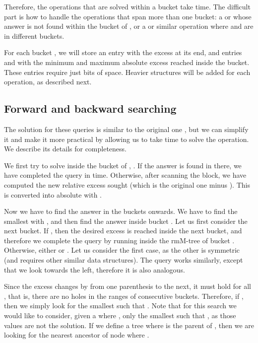 \documentclass[11pt]{article}
\newcommand{\0}{\mathit{0}}
\newcommand{\1}{\mathit{1}}
\begin{document}
Therefore, the operations that are solved within a bucket take 
time.  The difficult part is how to handle the operations that span more than 
one bucket: a  or  whose answer is not found
within the bucket of , or a  or similar operation where 
and  are in different buckets.

For each bucket , we will store an entry  with the
excess at its end, and entries  and  with the minimum and maximum absolute excess reached inside the
bucket. These entries require just  bits of 
space. Heavier structures will be added for each operation, as described next.

\subsection{Forward and backward searching}  \label{sec:fwd-large}

The solution for these queries is similar to the original one \cite{NS14},
but we can simplify it and make it more practical by allowing us to take
 time to solve the operation. 
We describe its details for completeness.

We first try to solve  inside the bucket of , 
. If the answer is found in there, we have completed
the query in  time. Otherwise, after scanning the block, we
have computed the new relative excess sought  (which is the original one
minus ). This is converted into absolute with
. 

Now we have to find the answer in the buckets  onwards. We have to find
the smallest  with , and then find the answer inside
bucket . Let us first consider the next bucket. If 
, then the desired excess is reached inside the 
next bucket, and therefore we complete the query by running 
 inside the rmM-tree of bucket .
Otherwise, either  or . Let us consider the first
case, as the other is symmetric (and requires other similar data structures).
The query  works
similarly, except that we look towards the left, therefore it is also analogous.

Since the excess changes by  from one parenthesis to the next, 
it must hold  for all
, that is, there are no holes in the ranges  of consecutive
buckets. Therefore, if , then we simply look for the smallest
 such that .
Note that for this search we would like to consider, given a  where
, only the smallest  such that , as those
values  are not the solution. If we define
a tree where  is the parent of , then we are looking for the nearest
ancestor  of node  where .
\end{document}
